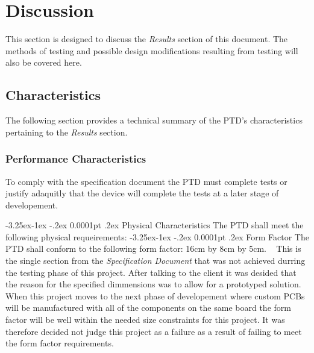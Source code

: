 \documentclass[11pt]{article}
\makeatletter
\renewcommand\paragraph{\@startsection{paragraph}{4}{\z@}%
                                     {-3.25ex\@plus -1ex \@minus -.2ex}%
                                     {0.0001pt \@plus .2ex}%
                                     {\normalfont\normalsize\bfseries}}
\renewcommand\subparagraph{\@startsection{subparagraph}{5}{\z@}%
                                     {-3.25ex\@plus -1ex \@minus -.2ex}%
                                     {0.0001pt \@plus .2ex}%
                                     {\normalfont\normalsize\bfseries}}
\makeatother
\begin{document}
\section{Discussion}
This section is designed to discuss the \textit{Results} section of this document. The methods of testing and possible design modifications resulting from 
testing will also be covered here.

\subsection{Characteristics}
The following section provides a technical summary of the PTD's characteristics pertaining to the \textit{Results} section.

\subsubsection{Performance Characteristics}
To comply with the specification document the PTD must complete tests or justify adaquitly that the device will complete the tests at a later stage of developement.

\paragraph{Physical Characteristics}
The PTD shall meet the following physical requeirements:
    \subparagraph{Form Factor}  The PTD shall conform to the following form factor: 16cm by 8cm by 5cm. \newline ~ \newline
        This is the single section from the \textit{Specification Document} that was not achieved durring the testing phase of this project. After talking to the client
        it was desided that the reason for the specified dimmensions was to allow for a prototyped solution. When this project moves to the next phase of developement where
        custom PCBs will be manufactured with all of the components on the same board the form factor will be well within the needed size constraints for this project.
        It was therefore decided not judge this project as a failure as a result of failing to meet the form factor requirements.
\end{document}

